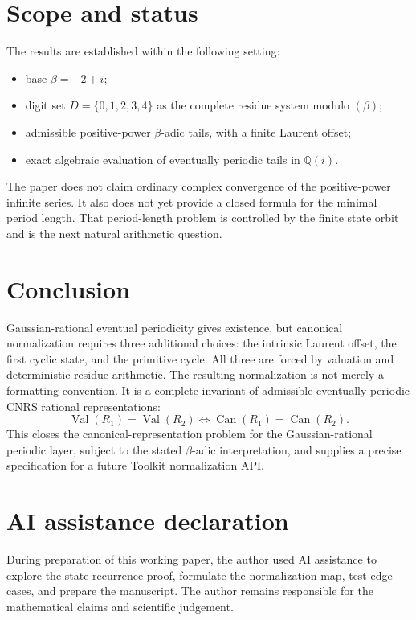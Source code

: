 \documentclass[11pt]{article}
\theoremstyle{definition}
\newcommand{\Qi}{\mathbb{Q}(i)}
\newcommand{\Can}{\operatorname{Can}}
\newcommand{\Value}{\operatorname{Val}}
\begin{document}
\section{Scope and status}

The results are established within the following setting:
\begin{itemize}
\item base $\beta=-2+i$;
\item digit set $D=\{0,1,2,3,4\}$ as the complete residue system modulo $(\beta)$;
\item admissible positive-power $\beta$-adic tails, with a finite Laurent offset;
\item exact algebraic evaluation of eventually periodic tails in $\Qi$.
\end{itemize}

The paper does not claim ordinary complex convergence of the positive-power infinite series.  It also does not yet provide a closed formula for the minimal period length.  That period-length problem is controlled by the finite state orbit and is the next natural arithmetic question.

\section{Conclusion}

Gaussian-rational eventual periodicity gives existence, but canonical normalization requires three additional choices: the intrinsic Laurent offset, the first cyclic state, and the primitive cycle.  All three are forced by valuation and deterministic residue arithmetic.  The resulting normalization is not merely a formatting convention.  It is a complete invariant of admissible eventually periodic CNRS rational representations:
\[
\boxed{
\Value(R_1)=\Value(R_2)
\iff
\Can(R_1)=\Can(R_2).
}
\]
This closes the canonical-representation problem for the Gaussian-rational periodic layer, subject to the stated $\beta$-adic interpretation, and supplies a precise specification for a future Toolkit normalization API.

\section*{AI assistance declaration}
During preparation of this working paper, the author used AI assistance to explore the state-recurrence proof, formulate the normalization map, test edge cases, and prepare the manuscript.  The author remains responsible for the mathematical claims and scientific judgement.
\end{document}
